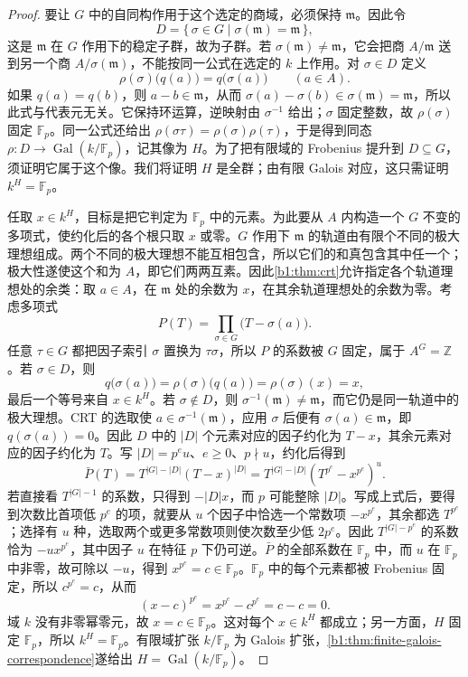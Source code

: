 \begin{proof}
	要让 \(G\) 中的自同构作用于这个选定的商域，必须保持 \(\mathfrak m\)。因此令
	\[
		D=\{\,\sigma\in G\mid\sigma(\mathfrak m)=\mathfrak m\,\},
	\]
	这是 \(\mathfrak m\) 在 \(G\) 作用下的稳定子群，故为子群。若 \(\sigma(\mathfrak m)\ne\mathfrak m\)，它会把商 \(A/\mathfrak m\) 送到另一个商 \(A/\sigma(\mathfrak m)\)，不能按同一公式在选定的 \(k\) 上作用。对 \(\sigma\in D\) 定义
	\[
		\rho(\sigma)\bigl(q(a)\bigr)=q\bigl(\sigma(a)\bigr)\qquad(a\in A).
	\]
	如果 \(q(a)=q(b)\)，则 \(a-b\in\mathfrak m\)，从而 \(\sigma(a)-\sigma(b)\in\sigma(\mathfrak m)=\mathfrak m\)，所以此式与代表元无关。它保持环运算，逆映射由 \(\sigma^{-1}\) 给出；\(\sigma\) 固定整数，故 \(\rho(\sigma)\) 固定 \(\mathbb F_p\)。同一公式还给出 \(\rho(\sigma\tau)=\rho(\sigma)\rho(\tau)\)，于是得到同态 \(\rho:D\longrightarrow\operatorname{Gal}(k/\mathbb F_p)\)，记其像为 \(H\)。为了把有限域的 Frobenius 提升到 \(D\subseteq G\)，须证明它属于这个像。我们将证明 \(H\) 是全群；由有限 Galois 对应，这只需证明 \(k^H=\mathbb F_p\)。

	任取 \(x\in k^H\)，目标是把它判定为 \(\mathbb F_p\) 中的元素。为此要从 \(A\) 内构造一个 \(G\) 不变的多项式，使约化后的各个根只取 \(x\) 或零。\(G\) 作用下 \(\mathfrak m\) 的轨道由有限个不同的极大理想组成。两个不同的极大理想不能互相包含，所以它们的和真包含其中任一个；极大性遂使这个和为 \(A\)，即它们两两互素。因此\cref{b1:thm:crt}允许指定各个轨道理想处的余类：取 \(a\in A\)，在 \(\mathfrak m\) 处的余数为 \(x\)，在其余轨道理想处的余数为零。考虑多项式
	\[
		P(T)=\prod_{\sigma\in G}\bigl(T-\sigma(a)\bigr).
	\]
	任意 \(\tau\in G\) 都把因子索引 \(\sigma\) 置换为 \(\tau\sigma\)，所以 \(P\) 的系数被 \(G\) 固定，属于 \(A^G=\mathbb Z\)。若 \(\sigma\in D\)，则
	\[
		q\bigl(\sigma(a)\bigr)=\rho(\sigma)\bigl(q(a)\bigr) =\rho(\sigma)(x)=x,
	\]
	最后一个等号来自 \(x\in k^H\)。若 \(\sigma\notin D\)，则 \(\sigma^{-1}(\mathfrak m)\ne\mathfrak m\)，而它仍是同一轨道中的极大理想。CRT 的选取使 \(a\in\sigma^{-1}(\mathfrak m)\)，应用 \(\sigma\) 后便有 \(\sigma(a)\in\mathfrak m\)，即 \(q(\sigma(a))=0\)。因此 \(D\) 中的 \(|D|\) 个元素对应的因子约化为 \(T-x\)，其余元素对应的因子约化为 \(T\)。写 \(|D|=p^e u\)、\(e\ge0\)、\(p\nmid u\)，约化后得到
	\[
		\bar P(T)=T^{|G|-|D|}(T-x)^{|D|} =T^{|G|-|D|}\left(T^{p^e}-x^{p^e}\right)^u.
	\]
	若直接看 \(T^{|G|-1}\) 的系数，只得到 \(-|D|x\)，而 \(p\) 可能整除 \(|D|\)。写成上式后，要得到次数比首项低 \(p^e\) 的项，就要从 \(u\) 个因子中恰选一个常数项 \(-x^{p^e}\)，其余都选 \(T^{p^e}\)；选择有 \(u\) 种，选取两个或更多常数项则使次数至少低 \(2p^e\)。因此 \(T^{|G|-p^e}\) 的系数恰为 \(-u x^{p^e}\)，其中因子 \(u\) 在特征 \(p\) 下仍可逆。\(\bar P\) 的全部系数在 \(\mathbb F_p\) 中，而 \(u\) 在 \(\mathbb F_p\) 中非零，故可除以 \(-u\)，得到 \(x^{p^e}=c\in\mathbb F_p\)。\(\mathbb F_p\) 中的每个元素都被 Frobenius 固定，所以 \(c^{p^e}=c\)，从而
	\[
		(x-c)^{p^e}=x^{p^e}-c^{p^e}=c-c=0.
	\]
	域 \(k\) 没有非零幂零元，故 \(x=c\in\mathbb F_p\)。这对每个 \(x\in k^H\) 都成立；另一方面，\(H\) 固定 \(\mathbb F_p\)，所以 \(k^H=\mathbb F_p\)。有限域扩张 \(k/\mathbb F_p\) 为 Galois 扩张，\cref{b1:thm:finite-galois-correspondence}遂给出 \(H=\operatorname{Gal}(k/\mathbb F_p)\)。


\end{proof}

